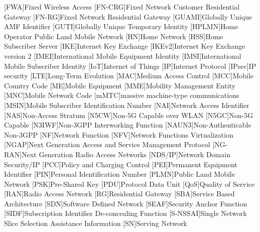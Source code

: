 \begin{multicols}{2}
\begin{acronym}[AAAAAA]
        [FWA]{Fixed Wireless Access}
        [FN-CRG]{Fixed Network Customer Residential Gateway}
        [FN-RG]{Fixed Network Residential Gateway}
        [GUAMI]{Globally Unique AMF Identifier}
        [GUTI]{Globally Unique Temporary Identity}
        [HPLMN]{Home Operator Public Land Mobile Network}
        [HN]{Home Network}
        [HSS]{Home Subscriber Server}
        [IKE]{Internet Key Exchange}
        [IKEv2]{Internet Key Exchange version 2}
        [IMEI]{International Mobile Equipment Identity}
        [IMSI]{International Mobile Subscriber Identity}
        [IoT]{Internet of Things}
        [IP]{Internet Protocol}
        [IPsec]{IP security}
        [LTE]{Long-Term Evolution}
        [MAC]{Medium Access Control}
        [MCC]{Mobile Country Code}
        [ME]{Mobile Equipment}
        [MME]{Mobility Management Entity}
        [MNC]{Mobile Network Code}
        [mMTC]{massive machine-type communications}
        [MSIN]{Mobile Subscriber Identification Number}
        [NAI]{Network Access Identifier}
        [NAS]{Non-Access Stratum}
        [N5CW]{Non-5G Capable over WLAN}
        [N5GC]{Non-5G Capable}
        [N3IWF]{Non-3GPP Interworking Function}
        [NAUN3]{Non-Authenticable Non-3GPP}
        [NF]{Network Function}
        [NFV]{Network Functions Virtualization}
        [NGAP]{Next Generation Access and Service Management Protocol}
        [NG-RAN]{Next Generation Radio Access Networks}
        [NDS/IP]{Network Domain Security/IP}
        [PCC]{Policy and Charging Control}
        [PEI]{Permanent Equipment Identifier}
        [PIN]{Personal Identification Number}
        [PLMN]{Public Land Mobile Network}
        [PSK]{Pre-Shared Key}
        [PDU]{Protocol Data Unit}
        [QoS]{Quality of Service}
        [RAN]{Radio Access Network}
        [RG]{Residential Gateway}
        [SBA]{Service Based Architecture}
        [SDN]{Software Defined Network}
        [SEAF]{Security Anchor Function}
        [SIDF]{Subscription Identifier De-concealing Function}
        [S-NSSAI]{Single Network Slice Selection Assistance Information}
        [SN]{Serving Network}

\end{acronym}
\end{multicols}
